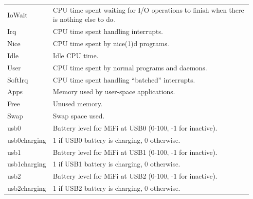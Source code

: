 \documentclass[a4paper,10pt]{article}
\begin{document}
\begin{appendices}
{\begin{longtable}{p{3cm}p{12cm}}
		IoWait                  & CPU time spent waiting for I/O operations to finish when there is nothing else to do.\\
		Irq                     & CPU time spent handling interrupts.\\
		Nice                    & CPU time spent by nice(1)d programs.\\
		Idle                    & Idle CPU time.\\
		User                    & CPU time spent by normal programs and daemons.\\
		SoftIrq                 & CPU time spent handling ``batched'' interrupts.\\		
		Apps                    & Memory used by user-space applications.\\
		Free                    & Unused memory.\\
		Swap                    & Swap space used.\\		
		usb0                    & Battery level for MiFi at USB0 (0-100, -1 for inactive). \\
		usb0charging            & 1 if USB0 battery is charging, 0 otherwise. \\
		usb1                    & Battery level for MiFi at USB1 (0-100, -1 for inactive). \\
		usb1charging            & 1 if USB1 battery is charging, 0 otherwise. \\
		usb2                    & Battery level for MiFi at USB2 (0-100, -1 for inactive). \\
		usb2charging            & 1 if USB2 battery is charging, 0 otherwise. \\
		\bottomrule
	\end{longtable}
}


\end{appendices}
\end{document}
